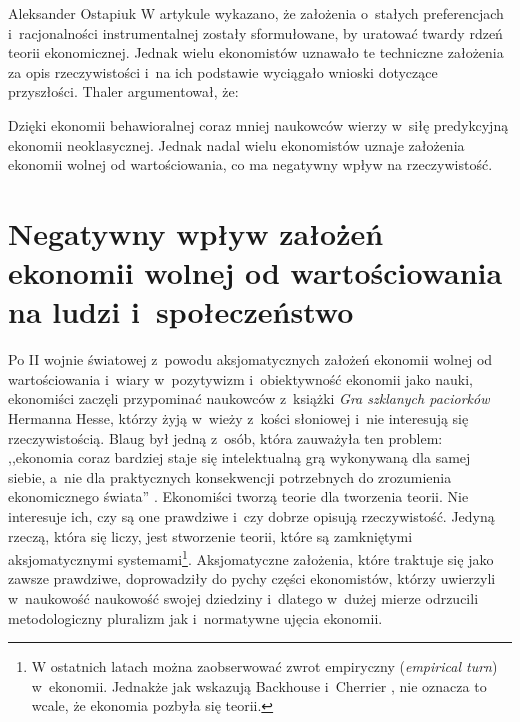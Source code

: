 \begin{artplenv}{Aleksander Ostapiuk}
W artykule wykazano, że założenia o~stałych preferencjach i~racjonalności instrumentalnej zostały sformułowane, by uratować
twardy rdzeń teorii ekonomicznej. Jednak wielu ekonomistów uznawało te techniczne założenia za opis rzeczywistości i~na
ich podstawie wyciągało wnioski dotyczące przyszłości. Thaler argumentował, że:

Dzięki ekonomii behawioralnej coraz mniej naukowców wierzy w~siłę predykcyjną ekonomii neoklasycznej. Jednak nadal wielu
ekonomistów uznaje założenia ekonomii wolnej od wartościowania, co ma negatywny wpływ na rzeczywistość. 

\section{Negatywny wpływ założeń ekonomii wolnej od wartościowania na ludzi i~społeczeństwo}
Po II wojnie światowej z~powodu aksjomatycznych założeń ekonomii wolnej od
wartościowania i~wiary w~pozytywizm i~obiektywność ekonomii jako nauki,
ekonomiści zaczęli przypominać naukowców z~książki \textit{Gra szklanych paciorków}
Hermanna Hesse, którzy żyją w~wieży z~kości słoniowej i~nie interesują się rzeczywistością. Blaug był jedną z~osób,
która zauważyła ten problem: ,,ekonomia coraz bardziej staje się intelektualną grą wykonywaną dla samej siebie, a~nie dla
praktycznych konsekwencji potrzebnych do zrozumienia ekonomicznego świata''
\parencite[s.~3]{blaug_ugly_1997}.
Ekonomiści tworzą teorie dla tworzenia teorii.
Nie interesuje ich, czy są one prawdziwe i~czy dobrze opisują rzeczywistość.
Jedyną rzeczą, która się liczy, jest stworzenie teorii, które są zamkniętymi aksjomatycznymi
systemami\footnote{W ostatnich latach można zaobserwować zwrot empiryczny
(\textit{empirical turn}) w~ekonomii.
Jednakże jak wskazują Backhouse i~Cherrier
\parencite*{backhouse_age_2017},
nie oznacza to wcale, że ekonomia
pozbyła się teorii.}. Aksjomatyczne założenia, które traktuje się jako zawsze prawdziwe, doprowadziły do pychy części ekonomistów, którzy
uwierzyli w~naukowość naukowość swojej dziedziny i~dlatego w~dużej mierze odrzucili metodologiczny pluralizm jak i~normatywne ujęcia ekonomii.


\end{artplenv}
